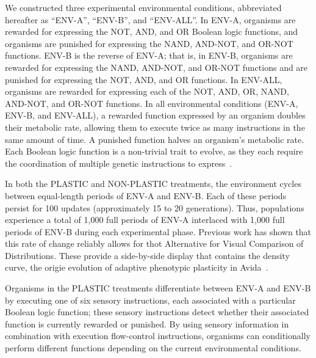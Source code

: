 \begin{raggedbottom}

We constructed three experimental environmental conditions, abbreviated hereafter as ``ENV-A'', ``ENV-B'', and ``ENV-ALL''.
In ENV-A, organisms are rewarded for expressing the NOT, AND, and OR Boolean logic functions, and organisms are punished for expressing the NAND, AND-NOT, and OR-NOT functions. 
ENV-B is the reverse of ENV-A; that is, in ENV-B, organisms are rewarded for expressing the NAND, AND-NOT, and OR-NOT functions and are punished for expressing the NOT, AND, and OR functions.
In ENV-ALL, organisms are rewarded for expressing each of the NOT, AND, OR, NAND, AND-NOT, and OR-NOT functions.
In all environmental conditions (ENV-A, ENV-B, and ENV-ALL), a rewarded function expressed by an organism doubles their metabolic rate, allowing them to execute twice as many instructions in the same amount of time.
A punished function halves an organism's metabolic rate.
Each Boolean logic function is a non-trivial trait to evolve, as they each require the coordination of multiple genetic instructions to express~\citep{lenski_evolutionary_2003}.


In both the PLASTIC and NON-PLASTIC treatments, the environment cycles between equal-length periods of ENV-A and ENV-B.
Each of these periods persist for 100 updates (approximately 15 to 20 generations).
Thus, populations experience a total of 1,000 full periods of ENV-A interlaced with 1,000 full periods of ENV-B during each experimental phase.
Previous work has shown that this rate of change reliably allows for thot Alternative for Visual Comparison of Distributions. These provide a side-by-side display that contains the density curve, the origie evolution of adaptive phenotypic plasticity in Avida~\citep{clune_investigating_2007,lalejini_evolutionary_2016}.

Organisms in the PLASTIC treatments differentiate between ENV-A and ENV-B by executing one of six sensory instructions, each associated with a particular Boolean logic function; these sensory instructions detect whether their associated function is currently rewarded or punished.
By using sensory information in combination with execution flow-control instructions, organisms can conditionally perform different functions depending on the current environmental conditions.


\end{raggedbottom}
